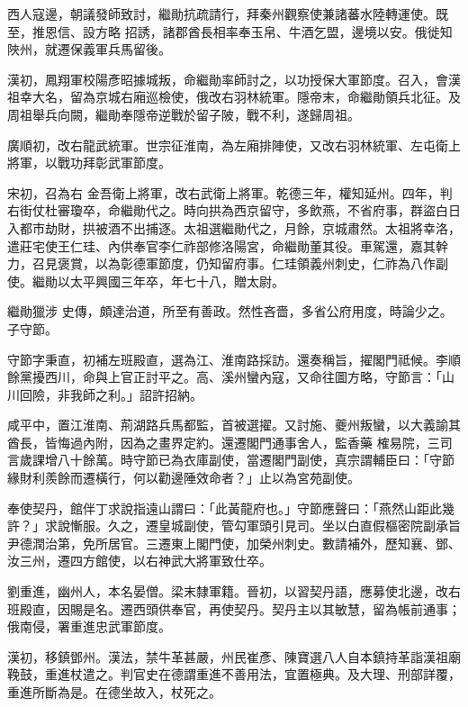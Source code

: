 \begin{pinyinscope}
 西人寇邊，朝議發師致討，繼勛抗疏請行，拜秦州觀察使兼諸蕃水陸轉運使。既至，推恩信、設方略
 招誘，諸郡酋長相率奉玉帛、牛酒乞盟，邊境以安。俄徙知陜州，就遷保義軍兵馬留後。



 漢初，鳳翔軍校陽彥昭據城叛，命繼勛率師討之，以功授保大軍節度。召入，會漢祖幸大名，留為京城右廂巡檢使，俄改右羽林統軍。隱帝末，命繼勛領兵北征。及周祖舉兵向闕，繼勛奉隱帝逆戰於留子陂，戰不利，遂歸周祖。



 廣順初，改右龍武統軍。世宗征淮南，為左廂排陣使，又改右羽林統軍、左屯衛上將軍，以戰功拜彰武軍節度。



 宋初，召為右
 金吾衛上將軍，改右武衛上將軍。乾德三年，權知延州。四年，判右街仗杜審瓊卒，命繼勛代之。時向拱為西京留守，多飲燕，不省府事，群盜白日入都市劫財，拱被酒不出捕逐。太祖選繼勛代之，月餘，京城肅然。太祖將幸洛，遣莊宅使王仁珪、內供奉官李仁祚部修洛陽宮，命繼勛董其役。車駕還，嘉其幹力，召見褒賞，以為彰德軍節度，仍知留府事。仁珪領義州刺史，仁祚為八作副使。繼勛以太平興國三年卒，年七十八，贈太尉。



 繼勛獵涉
 史傳，頗達治道，所至有善政。然性吝嗇，多省公府用度，時論少之。子守節。



 守節字秉直，初補左班殿直，選為江、淮南路採訪。還奏稱旨，擢閣門祗候。李順餘黨擾西川，命與上官正討平之。高、溪州蠻內寇，又命往圖方略，守節言：「山川回險，非我師之利。」詔許招納。



 咸平中，置江淮南、荊湖路兵馬都監，首被選擢。又討施、夔州叛蠻，以大義諭其酋長，皆悔過內附，因為之畫界定約。還遷閣門通事舍人，監香藥
 榷易院，三司言歲課增八十餘萬。時守節已為衣庫副使，當遷閣門副使，真宗謂輔臣曰：「守節緣財利羨餘而遷橫行，何以勸邊陲效命者？」止以為宮苑副使。



 奉使契丹，館伴丁求說指遠山謂曰：「此黃龍府也。」守節應聲曰：「燕然山距此幾許？」求說慚服。久之，遷皇城副使，管勾軍頭引見司。坐以白直假樞密院副承旨尹德潤治第，免所居官。三遷東上閣門使，加榮州刺史。數請補外，歷知襄、鄧、汝三州，遷四方館使，以右神武大將軍致仕卒。



 劉重進，幽州人，本名晏僧。梁末隸軍籍。晉初，以習契丹語，應募使北邊，改右班殿直，因賜是名。遷西頭供奉官，再使契丹。契丹主以其敏慧，留為帳前通事；俄南侵，署重進忠武軍節度。



 漢初，移鎮鄧州。漢法，禁牛革甚嚴，州民崔彥、陳寶選八人自本鎮持革詣漢祖廟鞔鼓，重進杖遣之。判官史在德謂重進不善用法，宜置極典。及大理、刑部詳覆，重進所斷為是。在德坐故入，杖死之。




\end{pinyinscope}
